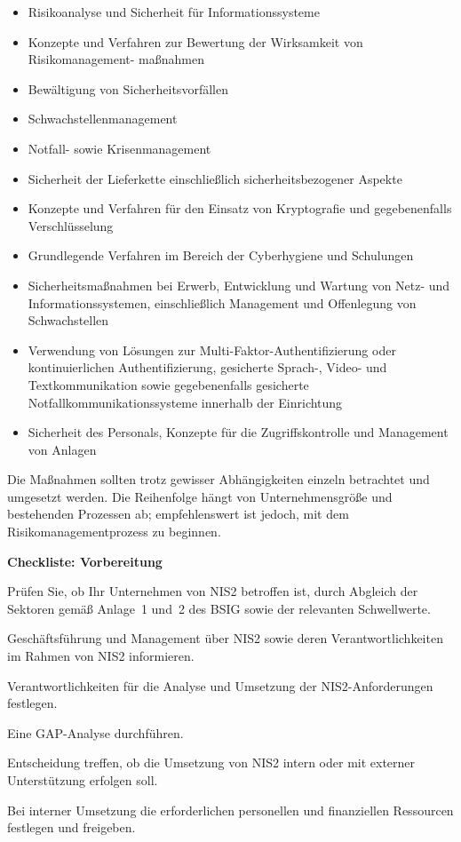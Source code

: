 \begin{itemize}
    \item Risikoanalyse und Sicherheit für Informationssysteme
    \item Konzepte und Verfahren zur Bewertung der Wirksamkeit von Risikomanagement-
    maßnahmen
    \item Bewältigung von Sicherheitsvorfällen
    \item Schwachstellenmanagement
    \item Notfall- sowie Krisenmanagement
    \item Sicherheit der Lieferkette einschließlich sicherheitsbezogener Aspekte
    \item Konzepte und Verfahren für den Einsatz von Kryptografie und gegebenenfalls Verschlüsselung
    \item Grundlegende Verfahren im Bereich der Cyberhygiene und Schulungen
    \item Sicherheitsmaßnahmen bei Erwerb, Entwicklung und Wartung von Netz-
    und Informationssystemen, einschließlich Management und Offenlegung von
    Schwachstellen
    \item Verwendung von Lösungen zur Multi-Faktor-Authentifizierung oder kontinuierlichen
    Authentifizierung, gesicherte Sprach-, Video- und Textkommunikation sowie
    gegebenenfalls gesicherte Notfallkommunikationssysteme innerhalb der Einrichtung
    \item Sicherheit des Personals, Konzepte für die Zugriffskontrolle und Management von
    Anlagen
\end{itemize}

Die Maßnahmen sollten trotz gewisser Abhängigkeiten einzeln betrachtet und umgesetzt werden. Die Reihenfolge hängt von Unternehmensgröße und bestehenden Prozessen ab; empfehlenswert ist jedoch, mit dem Risikomanagementprozess zu beginnen.

\newpage
\textbf{Checkliste: Vorbereitung}
\begin{checklist}
    \item Prüfen Sie, ob Ihr Unternehmen von NIS2 betroffen ist, durch Abgleich der Sektoren gemäß Anlage~1 und~2 des BSIG sowie der relevanten Schwellwerte.
    \item Geschäftsführung und Management über NIS2 sowie deren Verantwortlichkeiten im Rahmen von NIS2 informieren.
    \item Verantwortlichkeiten für die Analyse und Umsetzung der NIS2-Anforderungen festlegen.
    \item Eine GAP-Analyse durchführen.
    \item Entscheidung treffen, ob die Umsetzung von NIS2 intern oder mit externer Unterstützung erfolgen soll.
    \item Bei interner Umsetzung die erforderlichen personellen und finanziellen Ressourcen festlegen und freigeben.
\end{checklist}
